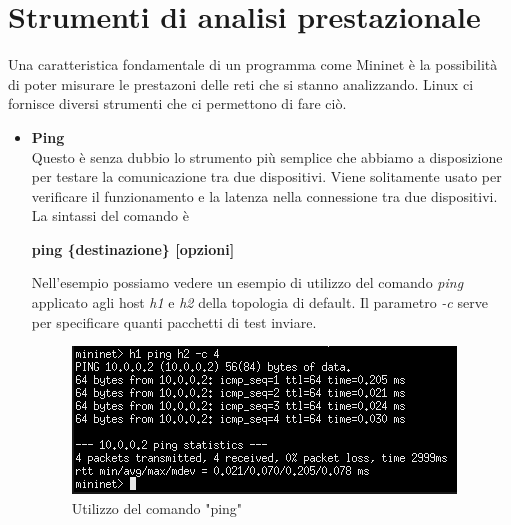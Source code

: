 \section{Strumenti di analisi prestazionale}\label{ch:2.3}
Una caratteristica fondamentale di un programma come Mininet è la possibilità di poter misurare le prestazoni delle reti che si stanno analizzando. Linux ci fornisce diversi strumenti che ci permettono di fare ciò.
\begin{itemize}
	\item \textbf{Ping}\\
	Questo è senza dubbio lo strumento più semplice che abbiamo a disposizione per testare la comunicazione tra due dispositivi. Viene solitamente usato per verificare il funzionamento e la latenza nella connessione tra due dispositivi.\\
	La sintassi del comando è
	\begin{center}
		\textbf{ping \{destinazione\} [opzioni]}
	\end{center}
	Nell'esempio possiamo vedere un esempio di utilizzo del comando \textit{ping} applicato agli host \textit{h1} e \textit{h2} della topologia di default. Il parametro \textit{-c} serve per specificare quanti pacchetti di test inviare.
	\begin{figure}[h!]
		\centering
		\includegraphics[width=0.85\linewidth]{../immagini/mn/ping}
		\caption[Comando "ping"]{Utilizzo del comando "ping"}
		\label{fig:ping}
	\end{figure}
	 

\end{itemize}
